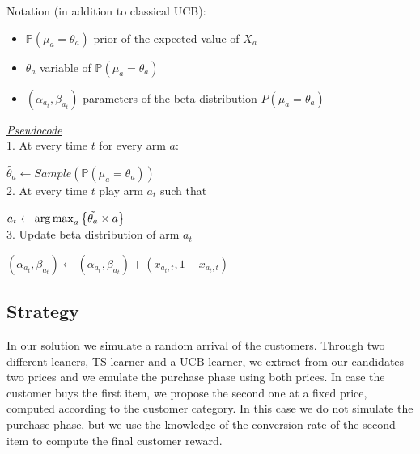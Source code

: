 Notation (in addition to classical UCB):\\
\begin{itemize}
	\item $\mathbb P(\mu_{a}=\theta_{a})$ prior of the expected value of $X_{a}$
	\item $\theta_{a}$ variable of $\mathbb P(\mu_{a}=\theta_{a})$
	\item $(\alpha_{a_{t}}, \beta_{a_{t}})$ parameters of the beta distribution $P(\mu_{a}=\theta_{a})$
\end{itemize}

\underline{\textit{Pseudocode}}\\

1. At every time $t$ for every arm $a$:

\hspace{2em}$\tilde{\theta_{a}} \leftarrow Sample(\mathbb P(\mu_{a}=\theta_{a}))$ \\

2. At every time $t$ play arm $a_{t}$ such that 

\hspace{2em}$a_{t} \leftarrow \operatorname{arg\,max}_a \left\{ \tilde{\theta_{a}} \times a \right\} $ \\

3.  Update beta distribution of arm $a_{t}$

\hspace{2em}$(\alpha_{a_{t}}, \beta_{a_{t}}) \leftarrow (\alpha_{a_{t}}, \beta_{a_{t}}) + (x_{a_{t},t}, 1 - x_{a_{t},t})$


\subsection*{Strategy}

In our solution we simulate a random arrival of the customers. Through two different leaners, TS learner and a UCB learner, we extract from our candidates two prices and we emulate the purchase phase using both prices. In case the customer buys the first item, we propose the second one at a fixed price, computed according to the customer category. In this case we do not simulate the purchase phase, but we use the knowledge of the conversion rate of the second item to compute the final customer reward. 

